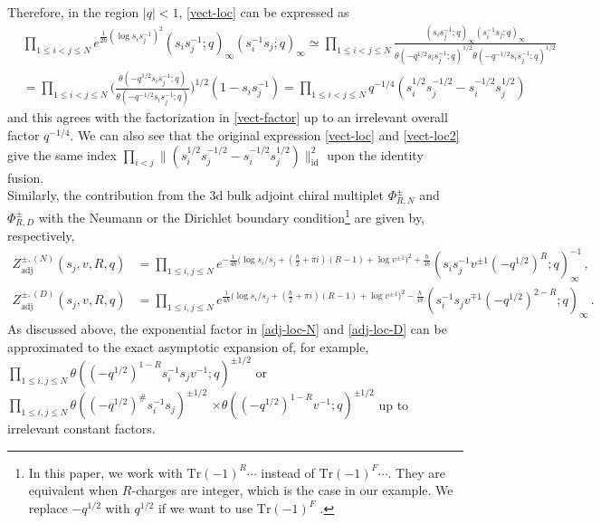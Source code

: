 \documentclass[11pt,hyper,a4paper]{article}
\begin{document}
Therefore, in the region $|q|<1$, \eqref{vect-loc} can be expressed as
\begin{align}
&\prod_{1 \leq i < j \leq N} e^{\frac{1}{2 \hbar} (\log s_i s_j^{-1})^2 } (s_i s_j^{-1};q)_\infty (s_i^{-1} s_j;q)_\infty
\simeq \prod_{1\leq i < j \leq N} \frac{(s_i s_j^{-1};q)_\infty (s_i^{-1} s_j;q)_\infty}{\theta(-q^{1/2} s_i s_j^{-1};q)^{1/2} \theta(-q^{-1/2} s_i s_j^{-1};q)^{1/2}} 	\label{vec-loc1}	\\
&= \prod_{1\leq i < j \leq N} \bigg( \frac{\theta(-q^{1/2} s_i s_j^{-1};q)}{\theta(-q^{-1/2} s_i s_j^{-1};q)} \bigg)^{1/2} (1-s_i s_j^{-1}) 
= \prod_{1\leq i < j \leq N} q^{-1/4} (s_i^{1/2} s_j^{-1/2} - s_i^{-1/2} s_j^{1/2})	\label{vect-loc2}
\end{align}
and this agrees with the factorization in \eqref{vect-factor} up to an irrelevant overall factor $q^{-1/4}$.
We can also see that the original expression \eqref{vect-loc} and \eqref{vect-loc2} give the same index $\prod_{i<j} \| (s_i^{1/2} s_j^{-1/2} - s_i^{-1/2} s_j^{1/2}) \|_{\text{id}}^2$ upon the identity fusion.	\\


Similarly, the contribution from the 3d bulk adjoint chiral multiplet $\Phi_{R,N}^{\pm}$ and $\Phi_{R,D}^{\pm}$ with the Neumann or the Dirichlet boundary condition\footnote{In this paper, we work with $\text{Tr} (-1)^R \cdots$ instead of $\text{Tr} (-1)^F \cdots$. 
They are equivalent when $R$-charges are integer, which is the case in our example. 
We replace $-q^{1/2}$ with $q^{1/2}$ if we want to use $\text{Tr} (-1)^F$ \cite{Beem-Dimofte-Pasquetti}.} \cite{Yoshida-Sugiyama} are given by, respectively,
\begin{align}
Z_{\text{adj}}^{\pm, (N)}(s_j, v, R, q) &= \prod_{1 \leq i , j \leq N} e^{ -\frac{1}{4 \hbar} \big( \log s_i/s_j +(\frac{\hbar}{2} + \pi i) (R-1) + \log v^{\pm 1} \big)^2 + \frac{\hbar}{48}} (s_i s_j^{-1} v^{\pm 1} (-q^{1/2})^{R};q)_\infty^{-1}\,,	\label{adj-loc-N}	\\
Z_{\text{adj}}^{\pm, (D)}(s_j, v, R, q) &= \prod_{1 \leq i , j \leq N} e^{ \frac{1}{4 \hbar} \big( \log s_i/s_j +(\frac{\hbar}{2} + \pi i) (R-1)+ \log v^{\pm 1} \big)^2 - \frac{\hbar}{48}} (s_i^{-1} s_j v^{\mp 1} (-q^{1/2})^{2-R};q)_\infty\,.	\label{adj-loc-D}
\end{align}
As discussed above, the exponential factor in \eqref{adj-loc-N} and \eqref{adj-loc-D} can be approximated to the exact asymptotic expansion of, for example, $\prod_{1 \leq i , j \leq N} \theta((-q^{1/2})^{1-R} s_i^{-1} s_j v^{-1};q)^{\pm 1/2}$ or $\prod_{1 \leq i , j \leq N} \theta((-q^{1/2})^{\#} s_i^{-1} s_j )^{\pm 1/2}$ $\times \theta((-q^{1/2})^{1-R} v^{-1};q)^{\pm 1/2}$ up to irrelevant constant factors.
\end{document}
